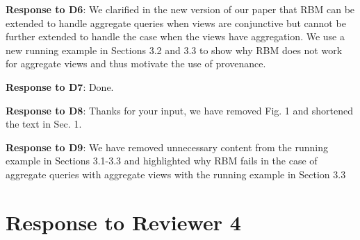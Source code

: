 \begin{appendix}


\textbf{Response to D6}:
We clarified in the new version of our paper that RBM can be extended to handle aggregate queries when views are conjunctive but cannot be further extended to handle the case when the views have aggregation. We use a new running example in Sections 3.2 and 3.3 to show why RBM does not work for aggregate views and thus motivate the use of provenance.




\textbf{Response to D7}: Done.




\textbf{Response to D8}: Thanks for your input, we have removed Fig. 1 and shortened the text in Sec. 1.



\textbf{Response to D9}: We have removed unnecessary content from the running example in Sections 3.1-3.3 and highlighted why RBM fails in the case of aggregate queries with aggregate views with the running example in Section 3.3


\section{Response to Reviewer 4}



\end{appendix}
